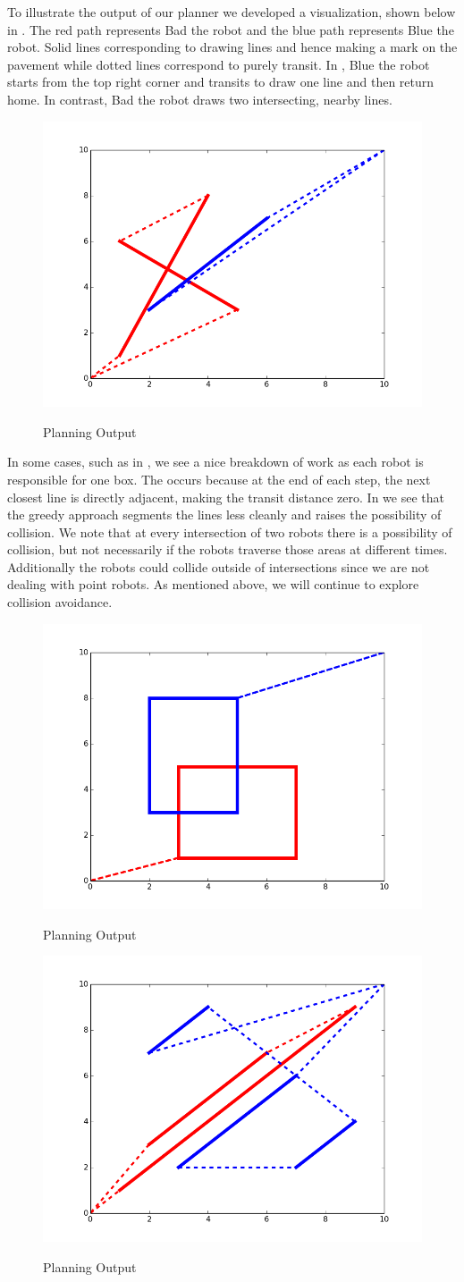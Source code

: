 To illustrate the output of our planner we developed a visualization, shown below in . The red path represents Bad the robot and the blue path represents Blue the robot. Solid lines corresponding to drawing lines and hence making a mark on the pavement while dotted lines correspond to purely transit. In , Blue the robot starts from the top right corner and transits to draw one line and then return home. In contrast, Bad the robot draws two intersecting, nearby lines.

\begin{figure}[h!]
\centering
\includegraphics[width=0.49\columnwidth]{figs/figure_1.png}
\label{fig:planner1}
\caption{Planning Output}
\end{figure}

In some cases, such as in , we see a nice breakdown of work as each robot is responsible for one box. The occurs because at the end of each step, the next closest line is directly adjacent, making the transit distance zero. In  we see that the greedy approach segments the lines less cleanly and raises the possibility of collision. We note that at every intersection of two robots there is a possibility of collision, but not necessarily if the robots traverse those areas at different times. Additionally the robots could collide outside of intersections since we are not dealing with point robots. As mentioned above, we will continue to explore collision avoidance. 

\begin{figure}[h!]
\centering
\includegraphics[width=0.49\columnwidth]{figs/figure_7.png}
\label{fig:planner2}
\caption{Planning Output}
\end{figure}

\begin{figure}[h!]
\centering
\includegraphics[width=0.49\columnwidth]{figs/figure_4.png}
\label{fig:planner3}
\caption{Planning Output}
\end{figure}
